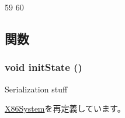 \begin{DoxyCode}
59 {
60 }
\end{DoxyCode}


\subsection{関数}
\hypertarget{classLinuxX86System_a3c34ea9b29f410748d4435a667484924}{
\subsubsection[{initState}]{\setlength{\rightskip}{0pt plus 5cm}void initState ()}}
\label{classLinuxX86System_a3c34ea9b29f410748d4435a667484924}
Serialization stuff 

\hyperlink{classX86System_a3c34ea9b29f410748d4435a667484924}{X86System}を再定義しています。


